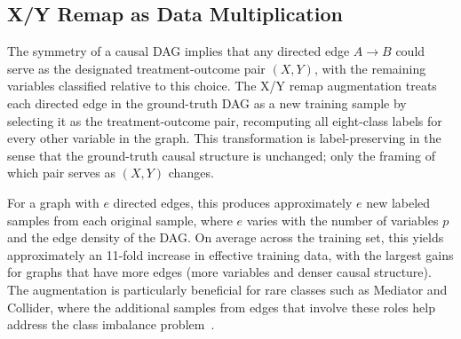 \subsection{X/Y Remap as Data Multiplication}
\label{sec:xy_remap}

The symmetry of a causal DAG implies that any directed edge $A\to B$ could serve as the designated treatment-outcome pair $(X,Y)$, with the remaining variables classified relative to this choice. The X/Y remap augmentation treats each directed edge in the ground-truth DAG as a new training sample by selecting it as the treatment-outcome pair, recomputing all eight-class labels for every other variable in the graph. This transformation is label-preserving in the sense that the ground-truth causal structure is unchanged; only the framing of which pair serves as $(X,Y)$ changes.

For a graph with $e$ directed edges, this produces approximately $e$ new labeled samples from each original sample, where $e$ varies with the number of variables $p$ and the edge density of the DAG. On average across the training set, this yields approximately an 11-fold increase in effective training data, with the largest gains for graphs that have more edges (more variables and denser causal structure). The augmentation is particularly beneficial for rare classes such as Mediator and Collider, where the additional samples from edges that involve these roles help address the class imbalance problem~\cite{olivetti2025adialab}.